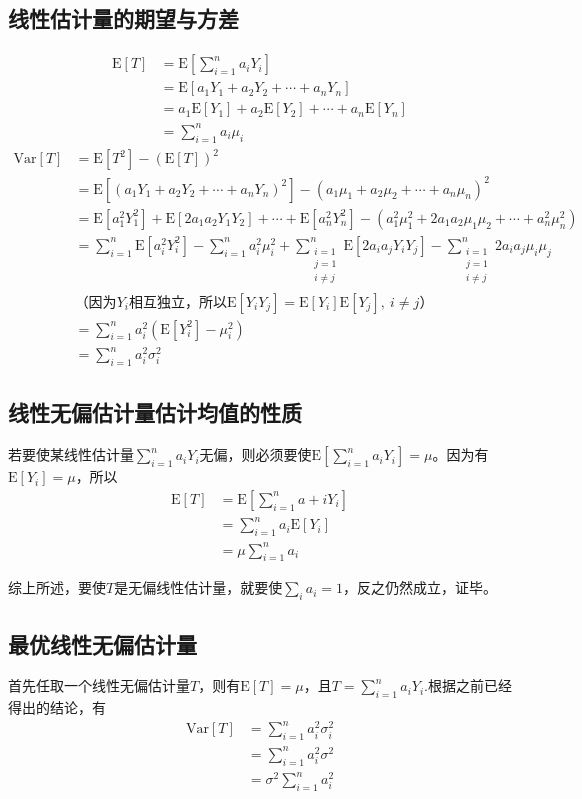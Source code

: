\documentclass[UTF8]{ctexbook}
\begin{document}
\subsection{线性估计量的期望与方差}
\label{proof2}
\begin{align*}
	\mathrm{E}[T]&=\mathrm{E}[\sum_{i=1}^na_iY_i]\\
	&=\mathrm{E}[a_1Y_1+a_2Y_2+\cdots+a_nY_n]\\
	&=a_1\mathrm{E}[Y_1]+a_2\mathrm{E}[Y_2]+\cdots+a_n\mathrm{E}[Y_n]\\
	&=\sum_{i=1}^na_i\mu_i
\end{align*}
\begin{align*}
	\mathrm{Var}[T]&=\mathrm{E}[T^2]-(\mathrm{E}[T])^2\\
	&=\mathrm{E}[(a_1Y_1+a_2Y_2+\cdots+a_nY_n)^2]-(a_1\mu_1+a_2\mu_2+\cdots+a_n\mu_n)^2\\
	&=\mathrm{E}[a_1^2Y_1^2]+\mathrm{E}[2a_1a_2Y_1Y_2]+\cdots+\mathrm{E}[a_n^2Y_n^2]-(a_1^2\mu_1^2+2a_1a_2\mu_1\mu_2+\cdots+a_n^2\mu_n^2)\\
	&=\sum_{i=1}^n\mathrm{E}[a_i^2Y_i^2]-\sum_{i=1}^na_i^2\mu_i^2+\sum_{\substack{i=1\\j=1\\i\neq j}}^n\mathrm{E}[2a_ia_jY_iY_j]-\sum_{\substack{i=1\\j=1\\i\neq j}}^n2a_ia_j\mu_i\mu_j\\
	&\text{（因为$Y_i$相互独立，所以$\mathrm{E}[Y_iY_j]=\mathrm{E}[Y_i]\mathrm{E}[Y_j],\ i\neq j$）}\\
	&=\sum_{i=1}^na_i^2(\mathrm{E}[Y_i^2]-\mu_i^2)\\
	&=\sum_{i=1}^na_i^2\sigma_i^2
\end{align*}
\subsection{线性无偏估计量估计均值的性质}
\label{proof3}
若要使某线性估计量$\sum_{i=1}^na_iY_i$无偏，则必须要使$\mathrm{E}[\sum_{i=1}^na_iY_i]=\mu$。因为有$\mathrm{E}[Y_i]=\mu$，所以
\begin{align*}
	\mathrm{E}[T]&=\mathrm{E}[\sum_{i=1}^na+iY_i]\\
	&=\sum_{i=1}^na_i\mathrm{E}[Y_i]\\
	&=\mu\sum_{i=1}^na_i
\end{align*}

综上所述，要使$T$是无偏线性估计量，就要使$\sum_{i}a_i=1$，反之仍然成立，证毕。
\subsection{最优线性无偏估计量}
\label{proof4}
首先任取一个线性无偏估计量$T$，则有$\mathrm{E}[T]=\mu$，且$T=\sum_{i=1}^na_iY_i$.根据之前已经得出的结论，有
\begin{align*}
	\mathrm{Var}[T]&=\sum_{i=1}^na_i^2\sigma_i^2\\
	&=\sum_{i=1}^na_i^2\sigma^2\\
	&=\sigma^2\sum_{i=1}^na_i^2\\
\end{align*}
\end{document}
